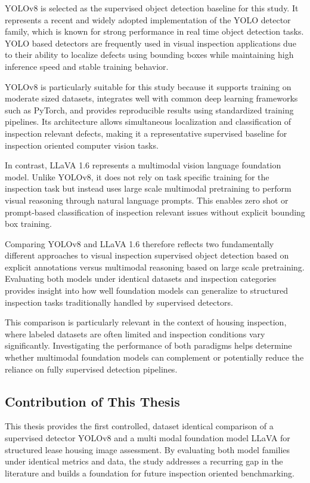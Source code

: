 YOLOv8 is selected as the supervised object detection baseline for this study. 
It represents a recent and widely adopted implementation of the YOLO detector family, 
which is known for strong performance in real time object detection tasks. 
YOLO based detectors are frequently used in visual inspection applications due 
to their ability to localize defects using bounding boxes while maintaining high 
inference speed and stable training behavior.

YOLOv8 is particularly suitable for this study because it supports training on 
moderate sized datasets, integrates well with common deep learning frameworks 
such as PyTorch, and provides reproducible results using standardized training 
pipelines. Its architecture allows simultaneous localization and classification of inspection relevant defects, making it a representative supervised baseline for inspection oriented computer vision tasks.

In contrast, LLaVA 1.6 represents a multimodal vision language foundation model. Unlike YOLOv8, it does not rely on task specific training for the inspection task but instead uses large scale multimodal pretraining to perform visual reasoning through natural language prompts\cite{liu_visual_2023}. This enables zero shot or prompt-based 
classification of inspection relevant issues without explicit bounding box training. 

Comparing YOLOv8 and LLaVA 1.6 therefore reflects two fundamentally different 
approaches to visual inspection supervised object detection based on explicit 
annotations versus multimodal reasoning based on large scale pretraining. 
Evaluating both models under identical datasets and inspection categories 
provides insight into how well foundation models can generalize to structured 
inspection tasks traditionally handled by supervised detectors.

This comparison is particularly relevant in the context of housing inspection, 
where labeled datasets are often limited and inspection conditions vary 
significantly. Investigating the performance of both paradigms helps determine whether multimodal foundation models can complement or potentially reduce 
the reliance on fully supervised detection pipelines.

\subsection{Contribution of This Thesis}

This thesis provides the first controlled, dataset identical comparison of a supervised detector YOLOv8 and a multi modal foundation model LLaVA for structured lease housing image assessment. By evaluating both model families under identical metrics and data, the study addresses a recurring gap in the literature and builds a foundation for future inspection oriented benchmarking.